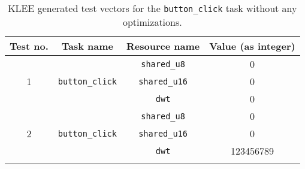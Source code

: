 \begin{longtable}{|c|c|c|c|}
\hline
Test no. & Task name & Resource name & Value (as integer) \\ \hline
\multirow{3}{*}{1} & \multirow{3}{*}{\texttt{button\_click}} & \texttt{shared\_u8}  & 0 \\ \cline{3-4}
                   &                                         & \texttt{shared\_u16} & 0 \\ \cline{3-4}
                   &                                         & \texttt{dwt}         & 0 \\ \hline
\multirow{3}{*}{2} & \multirow{3}{*}{\texttt{button\_click}} & \texttt{shared\_u8}  & 0 \\ \cline{3-4}
                   &                                         & \texttt{shared\_u16} & 0 \\ \cline{3-4}
                   &                                         & \texttt{dwt}         & 123456789 \\ \hline
\caption{KLEE generated test vectors for the \texttt{button\_click} task without any optimizations.}
\label{tab:evaldebugtestsbutton}
\end{longtable}

